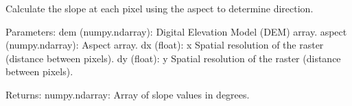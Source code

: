 \documentclass[letterpaper,10pt,english]{sphinxmanual}
\begin{document}

\begin{fulllineitems}
\label{\detokenize{akhdefo_functions:akhdefo_functions.Akhdefo_Tools.calculate_slope}}
\pysigstartsignatures
{}
\pysigstopsignatures
\sphinxAtStartPar
Calculate the slope at each pixel using the aspect to determine direction.

\sphinxAtStartPar
Parameters:
dem (numpy.ndarray): Digital Elevation Model (DEM) array.
aspect (numpy.ndarray): Aspect array.
dx (float):  x Spatial resolution of the raster (distance between pixels).
dy (float):  y Spatial resolution of the raster (distance between pixels).

\sphinxAtStartPar
Returns:
numpy.ndarray: Array of slope values in degrees.

\end{fulllineitems}

\end{document}

